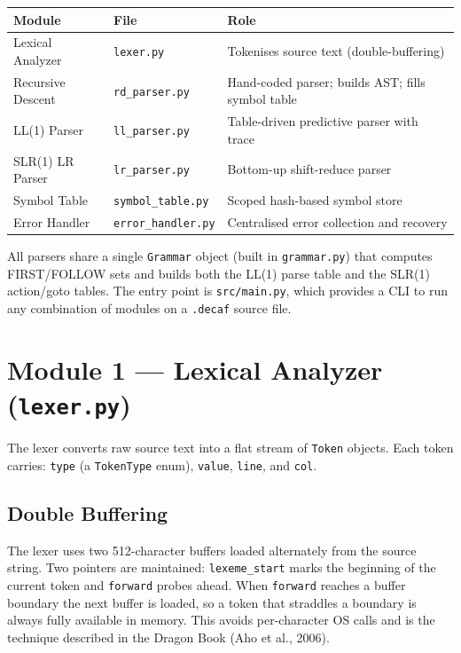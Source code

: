 \documentclass[12pt,a4paper]{article}
\begin{document}
\begin{center}
\begin{tabularx}{\linewidth}{llX}
\toprule
\textbf{Module} & \textbf{File} & \textbf{Role} \\
\midrule
Lexical Analyzer      & \texttt{lexer.py}        & Tokenises source text (double-buffering) \\
Recursive Descent     & \texttt{rd\_parser.py}   & Hand-coded parser; builds AST; fills symbol table \\
LL(1) Parser          & \texttt{ll\_parser.py}   & Table-driven predictive parser with trace \\
SLR(1) LR Parser      & \texttt{lr\_parser.py}   & Bottom-up shift-reduce parser \\
Symbol Table          & \texttt{symbol\_table.py}& Scoped hash-based symbol store \\
Error Handler         & \texttt{error\_handler.py}& Centralised error collection and recovery \\
\bottomrule
\end{tabularx}
\end{center}

All parsers share a single \texttt{Grammar} object (built in \texttt{grammar.py})
that computes FIRST/FOLLOW sets and builds both the LL(1) parse table and the
SLR(1) action/goto tables. The entry point is \texttt{src/main.py}, which provides
a CLI to run any combination of modules on a \texttt{.decaf} source file.

\section{Module 1 — Lexical Analyzer (\texttt{lexer.py})}

The lexer converts raw source text into a flat stream of \texttt{Token} objects.
Each token carries: \texttt{type} (a \texttt{TokenType} enum), \texttt{value},
\texttt{line}, and \texttt{col}.

\subsection*{Double Buffering}
The lexer uses two 512-character buffers loaded alternately from the source string.
Two pointers are maintained: \texttt{lexeme\_start} marks the beginning of the
current token and \texttt{forward} probes ahead. When \texttt{forward} reaches a
buffer boundary the next buffer is loaded, so a token that straddles a boundary is
always fully available in memory. This avoids per-character OS calls and is the
technique described in the Dragon Book (Aho et al., 2006).
\end{document}
